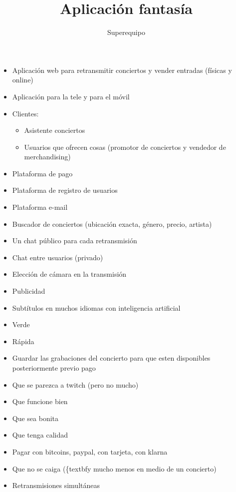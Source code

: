 \documentclass{article}
\title{Aplicación fantasía}
\author{Superequipo}
\date{}
\begin{document}
	\maketitle
	\begin{itemize}
		\item Aplicación web para retransmitir conciertos y vender entradas (físicas y online)
		\item Aplicación para la tele y para el móvil
		\item Clientes:
		\begin{itemize}
			\item Asistente conciertos
			\item Usuarios que ofrecen cosas (promotor de conciertos y vendedor de merchandising)
		\end{itemize}
		\item Plataforma de pago
		\item Plataforma de registro de usuarios
		\item Plataforma e-mail
		\item Buscador de conciertos (ubicación exacta, género, precio, artista)
		\item Un chat público para cada retransmisión
		\item Chat entre usuarios (privado)
		\item Elección de cámara en la transmisión
		\item Publicidad
		\item Subtítulos en muchos idiomas con inteligencia artificial
		\item Verde
		\item Rápida
		\item Guardar las grabaciones del concierto para que esten disponibles posteriormente previo pago
		\item Que se parezca a twitch (pero no mucho)
		\item Que funcione bien
		\item Que sea bonita
		\item Que tenga calidad
		\item Pagar con bitcoins, paypal, con tarjeta, con klarna
		\item Que no se caiga (\{textbf{y mucho menos en medio de un concierto})
		\item Retransmisiones simultáneas
	\end{itemize}
\end{document}
